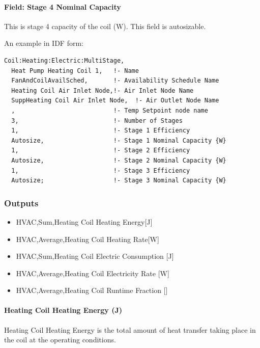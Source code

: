 \paragraph{Field: Stage 4 Nominal Capacity}\label{field-stage-4-nominal-capacity}

This is stage 4 capacity of the coil (W). This field is autosizable.

An example in IDF form:

\begin{lstlisting}
Coil:Heating:Electric:MultiStage,
  Heat Pump Heating Coil 1,   !- Name
  FanAndCoilAvailSched,       !- Availability Schedule Name
  Heating Coil Air Inlet Node,!- Air Inlet Node Name
  SuppHeating Coil Air Inlet Node,  !- Air Outlet Node Name
  ,                           !- Temp Setpoint node name
  3,                          !- Number of Stages
  1,                          !- Stage 1 Efficiency
  Autosize,                   !- Stage 1 Nominal Capacity {W}
  1,                          !- Stage 2 Efficiency
  Autosize,                   !- Stage 2 Nominal Capacity {W}
  1,                          !- Stage 3 Efficiency
  Autosize;                   !- Stage 3 Nominal Capacity {W}
\end{lstlisting}

\subsubsection{Outputs}\label{outputs-3-009}

\begin{itemize}
\item
  HVAC,Sum,Heating Coil Heating Energy{[}J{]}
\item
  HVAC,Average,Heating Coil Heating Rate{[}W{]}
\item
  HVAC,Sum,Heating Coil Electric Consumption {[}J{]}
\item
  HVAC,Average,Heating Coil Electricity Rate {[}W{]}
\item
  HVAC,Average,Heating Coil Runtime Fraction {[]}
\end{itemize}

\paragraph{Heating Coil Heating Energy (J)}\label{heating-coil-energy-j}

Heating Coil Heating Energy is the total amount of heat transfer taking place in the coil at the operating conditions.


